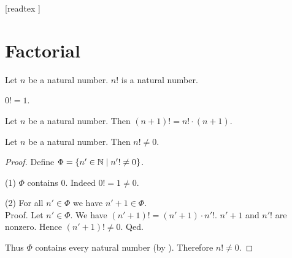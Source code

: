 \documentclass[10pt]{article}
\begin{document}
  \begin{imports}
    \begin{forthel}
      [readtex ]
    \end{forthel}
  \end{imports}


  \section*{Factorial}

  \begin{forthel}
    \begin{signature}[id=ARITHMETIC_12_0210357812531785,printid]
      Let $n$ be a natural number.
      $n!$ is a natural number.
    \end{signature}
  \end{forthel}

  \begin{forthel}
    \begin{axiom}[id=ARITHMETIC_12_6945210541236989,printid]
      $0! = 1$.
    \end{axiom}
  \end{forthel}

  \begin{forthel}
    \begin{axiom}[id=ARITHMETIC_12_2312015846987452,printid]
      Let $n$ be a natural number.
      Then $(n + 1)! = n! \cdot (n + 1)$.
    \end{axiom}
  \end{forthel}

  \begin{forthel}
    \begin{proposition}[id=ARITHMETIC_12_6123519005949952,printid]
      Let $n$ be a natural number.
      Then $n! \neq 0$.
    \end{proposition}
    \begin{proof}
      Define $\Phi = \{n' \in \mathbb{N} \mid n'! \neq 0 \}$.

      (1) $\Phi$ contains $0$.
      Indeed $0! = 1 \neq 0$.

      (2) For all $n' \in \Phi$ we have $n' + 1 \in \Phi$. \\
      Proof.
        Let $n' \in \Phi$.
        We have $(n' + 1)! = (n' + 1) \cdot n'!$.
        $n' + 1$ and $n'!$ are nonzero.
        Hence $(n' + 1)! \neq 0$.
      Qed.

      Thus $\Phi$ contains every natural number (by ).
      Therefore $n! \neq 0$.
    \end{proof}
  \end{forthel}
\end{document}
